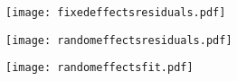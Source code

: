 \documentclass[12pt]{ecology}
\begin{document}
\begin{figure}
\texttt{[image: fixedeffectsresiduals.pdf]}
\caption{}
\label{fig:fixedeffectsresiduals}
\end{figure}

\begin{figure}
\texttt{[image: randomeffectsresiduals.pdf]}
\caption{}
\label{fig:randomeffectsresiduals}
\end{figure}

\begin{figure}
\texttt{[image: randomeffectsfit.pdf]}
\caption{}
\label{fig:randomeffectsfit}
\end{figure}









\end{document}
